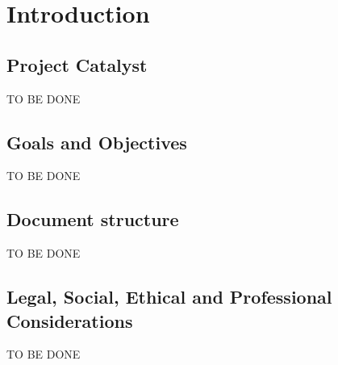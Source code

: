 \chapter{Introduction}
\label{Chapter:Introduction}

    \section{Project Catalyst}
    TO BE DONE
    
    \section{Goals and Objectives}
    TO BE DONE
    
    \section{Document structure}
    TO BE DONE
    
    \section{Legal, Social, Ethical and Professional Considerations}
    TO BE DONE